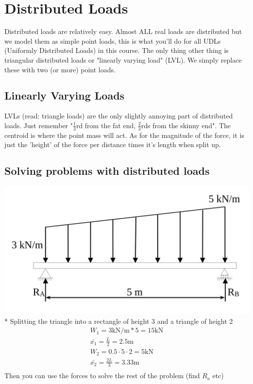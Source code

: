 \documentclass[a4paper, 12pt]{article}
\begin{document}
\section{Distributed Loads}
Distributed loads are relatively easy. Almost ALL real loads are distributed but we model them as 
simple point loads, this is what you'll do for all UDLs (Uniformly Distributed Loads) in this course. 
The only thing other thing is triangular distributed loads or "linearly varying load" (LVL). We simply 
replace these with two (or more) point loads.

\subsection{Linearly Varying Loads}
LVLs (read: triangle loads) are the only slightly annoying part of distributed loads. Just remember "$\frac{1}{3}$rd from 
the fat end, $\frac{2}{3}$rds from the skinny end". The centroid is where the point mass will act. As for the magnitude 
of the force, it is just the 'height' of the force per distance times it's length when split up.

\subsection{Solving problems with distributed loads}
\includegraphics[scale=0.2]{lvl} \\*
Splitting the triangle into a rectangle of height 3 and a triangle of height 2 
\begin{align*}
    W_1 = 3 \text{kN/m} * 5 = 15\text{kN} \\
    \bar{x_1} = \frac{L}{2} = 2.5\text{m} \\
    W_2 = 0.5 \cdot 5 \cdot 2 = 5\text{kN} \\
    \bar{x_2} = \frac{2L}{3} = 3.33\text{m} \\
\end{align*}
Then you can use the forces to solve the rest of the problem (find $R_a$ etc)
\end{document}
